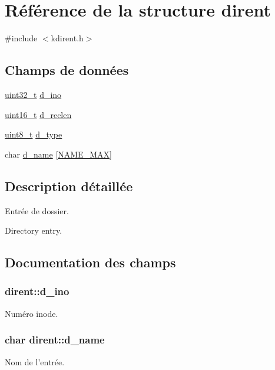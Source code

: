 \hypertarget{structdirent}{\section{Référence de la structure dirent}
\label{structdirent}
}


{\ttfamily \#include $<$kdirent.\-h$>$}

\subsection*{Champs de données}
\begin{DoxyCompactItemize}
\item 
\hyperlink{kernel_2include_2types_8h_a33594304e786b158f3fb30289278f5af}{uint32\-\_\-t} \hyperlink{structdirent_a0ed2e5ea3c71500f628914bf3966e4ba}{d\-\_\-ino}
\item 
\hyperlink{kernel_2include_2types_8h_adf4d876453337156dde61095e1f20223}{uint16\-\_\-t} \hyperlink{structdirent_a7cc67dd4ba5a8bed7f107f249957688d}{d\-\_\-reclen}
\item 
\hyperlink{kernel_2include_2types_8h_aba7bc1797add20fe3efdf37ced1182c5}{uint8\-\_\-t} \hyperlink{structdirent_a948760e3b7f607213a19f85e7af15a32}{d\-\_\-type}
\item 
char \hyperlink{structdirent_a4325a83c49c6f2cd01ef80e1ae1dd4c5}{d\-\_\-name} \mbox{[}\hyperlink{dirent_8h_ac64541bdd81c961304b9babef1402640}{N\-A\-M\-E\-\_\-\-M\-A\-X}\mbox{]}
\end{DoxyCompactItemize}


\subsection{Description détaillée}
Entrée de dossier.

Directory entry. 

\subsection{Documentation des champs}
\hypertarget{structdirent_a0ed2e5ea3c71500f628914bf3966e4ba}{
\subsubsection[{d\-\_\-ino}]{ dirent\-::d\-\_\-ino}}\label{structdirent_a0ed2e5ea3c71500f628914bf3966e4ba}
Numéro inode. \hypertarget{structdirent_a4325a83c49c6f2cd01ef80e1ae1dd4c5}{
\subsubsection[{d\-\_\-name}]{\setlength{\rightskip}{0pt plus 5cm}char dirent\-::d\-\_\-name}}\label{structdirent_a4325a83c49c6f2cd01ef80e1ae1dd4c5}
Nom de l'entrée.

